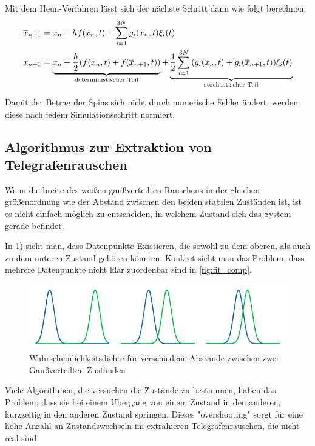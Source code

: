 \documentclass[main.tex]{subfiles}
\begin{document}
Mit dem Heun-Verfahren lässt sich der nächste Schritt dann wie folgt berechnen:
\begin{align}
    \overline{x}_{n+1} &= x_n + h f(x_n,t) + \sum_{i=1}^{3N} g_i(x_n,t) \xi_i(t) \\
    x_{n+1} &= \underbrace{x_n + \frac{h}{2} \qty(f(x_n,t) + f(\overline{x}_{n+1},t))}_\text{deterministischer Teil} + \underbrace{\frac{1}{2} \sum_{i=1}^{3N} \qty(g_i(x_n,t) + g_i(\overline{x}_{n+1},t)) \xi_i(t)}_\text{stochastischer Teil}
\end{align}

Damit der Betrag der Spins sich nicht durch numerische Fehler ändert, werden diese nach jedem Simulationsschritt normiert.

\subsection{Algorithmus zur Extraktion von Telegrafenrauschen}\label{algo}

Wenn die breite des weißen gaußverteilten Rauschens in der gleichen größenordnung wie der Abstand zwischen den beiden stabilen Zuständen ist, ist es nicht einfach möglich zu entscheiden, in welchem Zustand sich das System gerade befindet.

In \cref{fig:gauss-overlap}) sieht man, dass Datenpunkte Existieren, die sowohl zu dem oberen, als auch zu dem unteren Zustand gehören könnten. Konkret sieht man das Problem, dass mehrere Datenpunkte nicht klar zuordenbar sind in \cref{fig:fit_comp}.

\begin{figure}[h]
    \centering
    \includegraphics{bilder/plots/theo-vis/gauss-overlap.pdf}
    \caption{Wahrscheinlichkeitsdichte für verschiedene Abstände zwischen zwei Gaußverteilten Zuständen \label{fig:gauss-overlap}}
\end{figure}

Viele Algorithmen, die versuchen die Zustände zu bestimmen, haben das Problem, dass sie bei einem Übergang von einem Zustand in den anderen, kurzzeitig in den anderen Zustand springen. Dieses "overshooting" sorgt für eine hohe Anzahl an Zustandswechseln im extrahieren Telegrafenrauschen, die nicht real sind.
\end{document}

